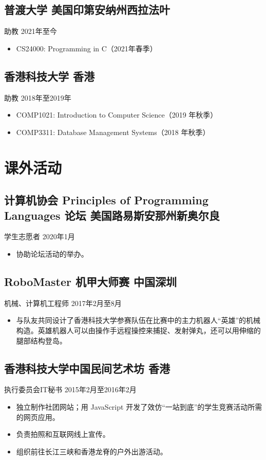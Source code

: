 \documentclass{article}
\newcommand{\subsec}[2]{\subsection*{#1 \hfill {\normalfont\sffamily\kaishu #2}}}
\newcommand{\subsecdesc}[2]{{#1 \hfill\sffamily\kaishu #2}}
\begin{document}
  \subsec{普渡大学}{美国印第安纳州西拉法叶}
  \subsecdesc{助教}{2021年至今}
  \begin{itemize}
    \item CS24000: Programming in C（2021年春季）
  \end{itemize}

  \subsec{香港科技大学}{香港}
  \subsecdesc{助教}{2018年至2019年}
  \begin{itemize}
    \item COMP1021: Introduction to Computer Science（2019 年秋季）
    \item COMP3311: Database Management Systems（2018 年秋季）
  \end{itemize}

\section*{课外活动} %

  \subsec{计算机协会 Principles of Programming Languages 论坛}{美国路易斯安那州新奥尔良}
  \subsecdesc{学生志愿者}{2020年1月}
  \begin{itemize}
    \item 协助论坛活动的举办。
  \end{itemize}

  \subsec{RoboMaster 机甲大师赛}{中国深圳}
  \subsecdesc{机械、计算机工程师}{2017年2月至8月}
  \begin{itemize}
    \item 与队友共同设计了香港科技大学参赛队伍在比赛中的主力机器人“英雄”的机械构造。英雄机器人可以由操作手远程操控来捕捉、发射弹丸，还可以用伸缩的腿部结构登岛。
  \end{itemize}

  \subsec{香港科技大学中国民间艺术坊}{香港}
  \subsecdesc{执行委员会IT秘书}{2015年2月至2016年2月}
  \begin{itemize}
    \item 独立制作社团网站；用 JavaScript 开发了效仿“一站到底”的学生竞赛活动所需的网页应用。
    \item 负责拍照和互联网线上宣传。
    \item 组织前往长江三峡和香港龙脊的户外出游活动。
  \end{itemize}
\end{document}
